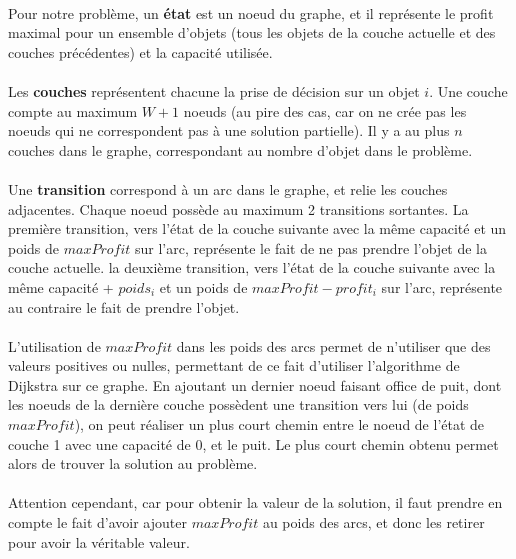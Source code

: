\documentclass[12pt]{article}
\begin{document}
\paragraph{}Pour notre problème, un \textbf{état} est un noeud du graphe, et il représente le profit maximal pour un ensemble d'objets (tous les objets de la couche actuelle et des couches précédentes) et la capacité utilisée.

\paragraph{}Les \textbf{couches} représentent chacune la prise de décision sur un objet $i$. Une couche compte au maximum $W+1$ noeuds (au pire des cas, car on ne crée pas les noeuds qui ne correspondent pas à une solution partielle). Il y a au plus $n$ couches dans le graphe, correspondant au nombre d'objet dans le problème.

\paragraph{}Une \textbf{transition} correspond à un arc dans le graphe, et relie les couches adjacentes. Chaque noeud possède au maximum 2 transitions sortantes. La première transition, vers l'état de la couche suivante avec la même capacité et un poids de $maxProfit$ sur l'arc, représente le fait de ne pas prendre l'objet de la couche actuelle. la deuxième transition, vers l'état de la couche suivante avec la même capacité + $poids_i$  et un poids de $maxProfit - profit_i$ sur l'arc, représente au contraire le fait de prendre l'objet.

\paragraph{}L'utilisation de $maxProfit$ dans les poids des arcs permet de n'utiliser que des valeurs positives ou nulles, permettant de ce fait d'utiliser l'algorithme de Dijkstra sur ce graphe. En ajoutant un dernier noeud faisant office de puit, dont les noeuds de la dernière couche possèdent une transition vers lui (de poids $maxProfit$), on peut réaliser un plus court chemin entre le noeud de l'état de couche 1 avec une capacité de 0, et le puit. Le plus court chemin obtenu permet alors de trouver la solution au problème.

\paragraph{}Attention cependant, car pour obtenir la valeur de la solution, il faut prendre en compte le fait d'avoir ajouter $maxProfit$ au poids des arcs, et donc les retirer pour avoir la véritable valeur.
\end{document}
